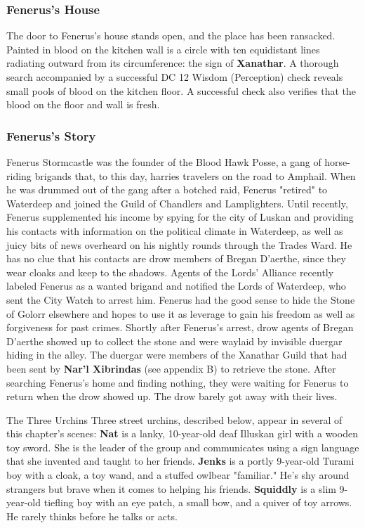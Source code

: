 \documentclass[10pt,a4paper,twoside,twocolumn,openany,nodeprecatedcode]{dndbook}
\begin{document}
\subsubsection{Fenerus's House}
The door to Fenerus's house stands open, and the place has been ransacked. Painted in blood on the kitchen wall is a circle with ten equidistant lines radiating outward from its circumference: the sign of \textbf{Xanathar}. A thorough search accompanied by a successful DC 12 Wisdom (Perception) check reveals small pools of blood on the kitchen floor. A successful check also verifies that the blood on the floor and wall is fresh.
\subsubsection{Fenerus's Story}
Fenerus Stormcastle was the founder of the Blood Hawk Posse, a gang of horse-riding brigands that, to this day, harries travelers on the road to Amphail. When he was drummed out of the gang after a botched raid, Fenerus "retired" to Waterdeep and joined the Guild of Chandlers and Lamplighters.
Until recently, Fenerus supplemented his income by spying for the city of Luskan and providing his contacts with information on the political climate in Waterdeep, as well as juicy bits of news overheard on his nightly rounds through the Trades Ward. He has no clue that his contacts are drow members of Bregan D'aerthe, since they wear cloaks and keep to the shadows.
Agents of the Lords' Alliance recently labeled Fenerus as a wanted brigand and notified the Lords of Waterdeep, who sent the City Watch to arrest him. Fenerus had the good sense to hide the Stone of Golorr elsewhere and hopes to use it as leverage to gain his freedom as well as forgiveness for past crimes.
Shortly after Fenerus's arrest, drow agents of Bregan D'aerthe showed up to collect the stone and were waylaid by invisible duergar hiding in the alley. The duergar were members of the Xanathar Guild that had been sent by \textbf{Nar'l Xibrindas} (see appendix B) to retrieve the stone. After searching Fenerus's home and finding nothing, they were waiting for Fenerus to return when the drow showed up. The drow barely got away with their lives.
\begin{DndComment}{The Three Urchins}
Three street urchins, described below, appear in several of this chapter's scenes: \textbf{Nat} is a lanky, 10-year-old deaf Illuskan girl with a wooden toy sword. She is the leader of the group and communicates using a sign language that she invented and taught to her friends. \textbf{Jenks} is a portly 9-year-old Turami boy with a cloak, a toy wand, and a stuffed owlbear "familiar." He's shy around strangers but brave when it comes to helping his friends. \textbf{Squiddly} is a slim 9-year-old tiefling boy with an eye patch, a small bow, and a quiver of toy arrows. He rarely thinks before he talks or acts.
\end{DndComment}
\end{document}
